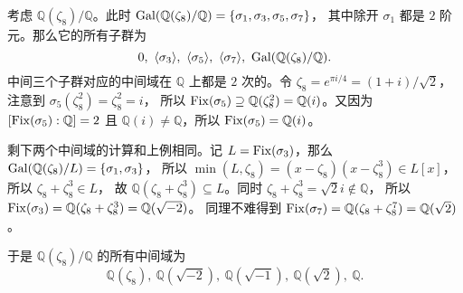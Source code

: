 \begin{example}\label{exa:Q8}
  考虑 $\mathbb{Q}(\zeta_8)/\mathbb{Q}$。此时 $\operatorname{Gal}(\mathbb{Q}(\zeta_8)/\mathbb{Q})=\{\sigma_1,\sigma_3,\sigma_5,\sigma_7\}$，
  其中除开 $\sigma_1$ 都是 $2$ 阶元。那么它的所有子群为
  \[
    0,\ \langle\sigma_3\rangle,\ \langle\sigma_5\rangle,\ \langle\sigma_7\rangle,\ 
    \Gal(\mathbb{Q}(\zeta_8)/\mathbb{Q}).
  \]
  中间三个子群对应的中间域在 $\mathbb{Q}$ 上都是 $2$ 次的。令 $\zeta_8=e^{\pi i/4}=(1+i)/\sqrt{2}$，注意到 $\sigma_5(\zeta_8^2)=\zeta_8^2=i$，
  所以 $\operatorname{Fix}(\sigma_5)\supseteq \mathbb{Q}(\zeta_8^2)=\mathbb{Q}(i)$。又因为 $[\operatorname{Fix}(\sigma_5):\mathbb{Q}]=2$
  且 $\mathbb{Q}(i)\neq \mathbb{Q}$，所以 $\operatorname{Fix}(\sigma_5)=\mathbb{Q}(i)$。

  剩下两个中间域的计算和上例相同。记 $L=\operatorname{Fix}(\sigma_3)$，那么 $\operatorname{Gal}(\mathbb{Q}(\zeta_8)/L)=\{\sigma_1,\sigma_3\}$，
  所以 $\min(L,\zeta_8)=(x-\zeta_8)(x-\zeta_8^3)\in L[x]$，所以 $\zeta_8+\zeta_8^3\in L$，
  故 $\mathbb{Q}(\zeta_8+\zeta_8^3)\subseteq L$。同时 $\zeta_8+\zeta_8^3=\sqrt{2}i\notin \mathbb{Q}$，
  所以 $\operatorname{Fix}(\sigma_3)=\mathbb{Q}(\zeta_8+\zeta_8^3)=\mathbb{Q}(\sqrt{-2})$。
  同理不难得到 $\operatorname{Fix}(\sigma_7)=\mathbb{Q}(\zeta_8+\zeta_8^7)=\mathbb{Q}(\sqrt{2})$。

  于是 $\mathbb{Q}(\zeta_8)/\mathbb{Q}$ 的所有中间域为
  \[
    \mathbb{Q}(\zeta_8),\ \mathbb{Q}(\sqrt{-2}),\ \mathbb{Q}(\sqrt{-1}),\ 
    \mathbb{Q}(\sqrt{2}),\ \mathbb{Q}.
  \]
\end{example}



